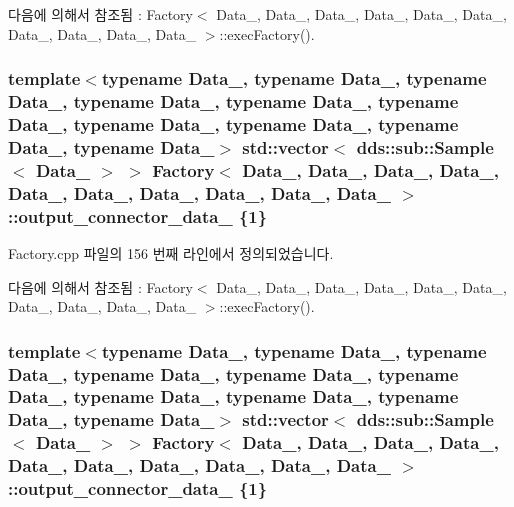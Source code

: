 다음에 의해서 참조됨 \+:  Factory$<$ Data\+\_, Data\+\_, Data\+\_, Data\+\_, Data\+\_, Data\+\_, Data\+\_, Data\+\_, Data\+\_, Data\+\_ $>$\+::exec\+Factory().

\subsubsection[{\texorpdfstring{output\+\_\+connector\+\_\+data\+\_\+4}{output_connector_data_4}}]{\setlength{\rightskip}{0pt plus 5cm}template$<$typename Data\+\_, typename Data\+\_, typename Data\+\_, typename Data\+\_, typename Data\+\_, typename Data\+\_, typename Data\+\_, typename Data\+\_, typename Data\+\_, typename Data\+\_$>$ std\+::vector$<$ dds\+::sub\+::\+Sample$<$ Data\+\_ $>$ $>$ {\bf Factory}$<$ Data\+\_, Data\+\_, Data\+\_, Data\+\_, Data\+\_, Data\+\_, Data\+\_, Data\+\_, Data\+\_, Data\+\_ $>$\+::output\+\_\+connector\+\_\+data\+\_ \{1\}}\hypertarget{classFactory_add95efaac04f798e826ac10668d38e48}{}\label{classFactory_add95efaac04f798e826ac10668d38e48}


Factory.\+cpp 파일의 156 번째 라인에서 정의되었습니다.



다음에 의해서 참조됨 \+:  Factory$<$ Data\+\_, Data\+\_, Data\+\_, Data\+\_, Data\+\_, Data\+\_, Data\+\_, Data\+\_, Data\+\_, Data\+\_ $>$\+::exec\+Factory().

\subsubsection[{\texorpdfstring{output\+\_\+connector\+\_\+data\+\_\+5}{output_connector_data_5}}]{\setlength{\rightskip}{0pt plus 5cm}template$<$typename Data\+\_, typename Data\+\_, typename Data\+\_, typename Data\+\_, typename Data\+\_, typename Data\+\_, typename Data\+\_, typename Data\+\_, typename Data\+\_, typename Data\+\_$>$ std\+::vector$<$ dds\+::sub\+::\+Sample$<$ Data\+\_ $>$ $>$ {\bf Factory}$<$ Data\+\_, Data\+\_, Data\+\_, Data\+\_, Data\+\_, Data\+\_, Data\+\_, Data\+\_, Data\+\_, Data\+\_ $>$\+::output\+\_\+connector\+\_\+data\+\_ \{1\}}\hypertarget{classFactory_ae8ed17f677db9e6c55b3f75379baf818}{}\label{classFactory_ae8ed17f677db9e6c55b3f75379baf818}


